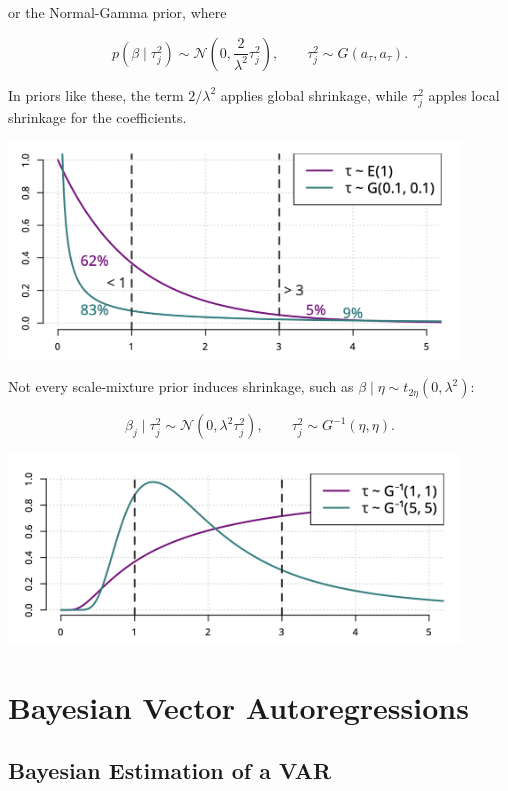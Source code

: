 or the Normal-Gamma prior, where

\[
	p(\beta\mid\tau_j^2) \sim\mathcal{N}\left(0,\frac{2}{\lambda^2}\tau_j^2\right), \qquad \tau^2_j \sim G(a_\tau,a_\tau).
\]

In priors like these, the term $2/\lambda^2$ applies global shrinkage, while $\tau^2_j$ apples local shrinkage for the coefficients.

\begin{center}
	\includegraphics[width = 12cm]{shrinkage.png}
\end{center}

Not every scale-mixture prior induces shrinkage, such as $\beta\mid\eta\sim t_{2\eta}(0,\lambda^2)$:

\[
	\beta_j\mid\tau_j^2\sim\mathcal{N}(0,\lambda^2\tau^2_j), \qquad \tau^2_j\sim G^{-1}(\eta,\eta).
\]

\begin{center}
	\includegraphics[width = 12cm]{noshrinkage.png}
\end{center}



\section{Bayesian Vector Autoregressions}

\subsection{Bayesian Estimation of a VAR}

